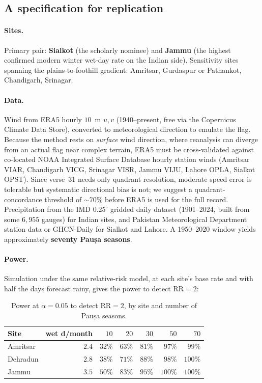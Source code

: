 \documentclass[11pt,a4paper]{article}
\begin{document}
\subsection{A specification for replication}
\label{sec:repl}

\paragraph{Sites.} Primary pair: \textbf{Sialkot} (the scholarly nominee) and \textbf{Jammu} (the highest confirmed modern winter wet-day rate on the Indian side). Sensitivity sites spanning the plains-to-foothill gradient: Amritsar, Gurdaspur or Pathankot, Chandigarh, Srinagar.

\paragraph{Data.} Wind from ERA5 hourly $10$~m $u,v$ (1940--present, free via the Copernicus Climate Data Store), converted to meteorological direction to emulate the flag. Because the method rests on \emph{surface} wind direction, where reanalysis can diverge from an actual flag near complex terrain, ERA5 must be cross-validated against co-located NOAA Integrated Surface Database hourly station winds (Amritsar VIAR, Chandigarh VICG, Srinagar VISR, Jammu VIJU, Lahore OPLA, Sialkot OPST). Since verse~31 needs only quadrant resolution, moderate speed error is tolerable but systematic directional bias is not; we suggest a quadrant-concordance threshold of $\sim70\%$ before ERA5 is used for the full record. Precipitation from the IMD $0.25^\circ$ gridded daily dataset (1901--2024, built from some $6{,}955$ gauges) \cite{pai} for Indian sites, and Pakistan Meteorological Department station data or GHCN-Daily for Sialkot and Lahore. A 1950--2020 window yields approximately \textbf{seventy Pauṣa seasons}.

\paragraph{Power.} Simulation under the same relative-risk model, at each site's base rate and with half the days forecast rainy, gives the power to detect $\mathrm{RR}=2$:

\begin{table}[H]\centering\small
\caption{Power at $\alpha=0.05$ to detect $\mathrm{RR}=2$, by site and number of Pauṣa seasons.}
\label{tab:seasons}
\begin{tabular}{lrrrrrr}
\toprule
Site & wet d/month & $10$ & $20$ & $30$ & $50$ & $70$\\
\midrule
Amritsar & $2.4$ & $32\%$ & $63\%$ & $81\%$ & $97\%$ & $99\%$\\
Dehradun & $2.8$ & $38\%$ & $71\%$ & $88\%$ & $98\%$ & $100\%$\\
Jammu & $3.5$ & $50\%$ & $83\%$ & $95\%$ & $100\%$ & $100\%$\\
\bottomrule
\end{tabular}
\end{table}
\end{document}
